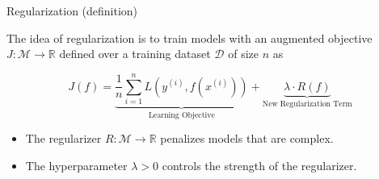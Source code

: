 \documentclass[../../main.tex]{subfiles}
\begin{document}
 \begin{frame}[fragile]{Regularization (definition)}

The idea of regularization is to train models with an augmented objective $J : \mathcal{M} \to \mathbb{R}$ defined over a training dataset $\mathcal{D}$ of size $n$ as

$$J(f) = \underbrace{\frac{1}{n} \sum_{i=1}^n L(y^{(i)}, f(x^{(i)}))}_\text{Learning Objective} + \underbrace{\lambda \cdot R(f)}_\text{New Regularization Term}$$

\begin{itemize}
    \item The regularizer $R : \mathcal{M} \to \mathbb{R}$ penalizes models that are complex. 
\end{itemize}
\begin{itemize}
    \item The hyperparameter $\lambda > 0$ controls the strength of the regularizer. 
\end{itemize}



\end{frame}
\end{document}
